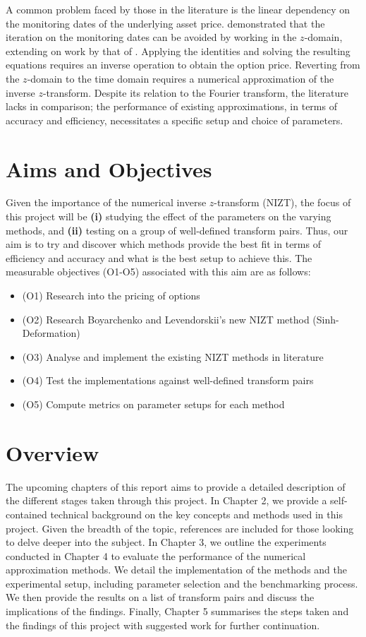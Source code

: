 \documentclass[a4paper]{report}
\begin{document}
A common problem faced by those in the literature is the linear dependency on the monitoring dates of the underlying asset price. \citet{fusai2016spitzer} demonstrated that the iteration on the monitoring dates can be avoided by working in the $z$-domain, extending on work by that of \citet{carr1999option}. Applying the \citet{spitzer1957wiener} identities and solving the resulting equations requires an inverse operation to obtain the option price. Reverting from the $z$-domain to the time domain requires a numerical approximation of the inverse $z$-transform. Despite its relation to the Fourier transform, the literature lacks in comparison; the performance of existing approximations, in terms of accuracy and efficiency, necessitates a specific setup and choice of parameters.

\section{Aims and Objectives}
Given the importance of the numerical inverse $z$-transform (NIZT), the focus of this project will be \textbf{(i)} studying the effect of the parameters on the varying methods, and \textbf{(ii)} testing on a group of well-defined transform pairs. Thus, our aim is to try and discover which methods provide the best fit in terms of efficiency and accuracy and what is the best setup to achieve this. The measurable objectives (O1-O5) associated with this aim are as follows:

\begin{itemize}
	\item (O1) Research into the pricing of options
	\item (O2) Research Boyarchenko and Levendorskii's new NIZT method (Sinh-Deformation)
	\item (O3) Analyse and implement the existing NIZT methods in literature
	\item (O4) Test the implementations against well-defined transform pairs
	\item (O5) Compute metrics on parameter setups for each method
\end{itemize}

\section{Overview}
The upcoming chapters of this report aims to provide a detailed description of the different stages taken through this project. In Chapter 2, we provide a self-contained technical background on the key concepts and methods used in this project. Given the breadth of the topic, references are included for those looking to delve deeper into the subject. In Chapter 3, we outline the experiments conducted in Chapter 4 to evaluate the performance of the numerical approximation methods. We detail the implementation of the methods and the experimental setup, including parameter selection and the benchmarking process. We then provide the results on a list of transform pairs and discuss the implications of the findings. Finally, Chapter 5 summarises the steps taken and the findings of this project with suggested work for further continuation. 
\end{document}
